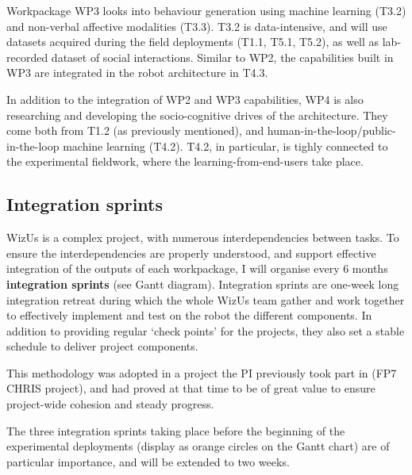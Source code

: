 \documentclass[11pt,a4paper]{report}
\newcommand{\project}{WizUs\xspace}
\begin{document}
Workpackage WP3 looks into behaviour generation using machine learning (T3.2)
and non-verbal affective modalities (T3.3). T3.2 is data-intensive, and will use
datasets acquired during the field deployments (T1.1, T5.1, T5.2), as well as
lab-recorded dataset of social interactions. Similar to WP2, the capabilities
built in WP3 are integrated in the robot architecture in T4.3.

In addition to the integration of WP2 and WP3 capabilities, WP4 is also
researching and developing the socio-cognitive drives of the architecture. They
come both from T1.2 (as previously mentioned), and
human-in-the-loop/public-in-the-loop machine learning (T4.2). T4.2, in
particular, is tighly connected to the experimental fieldwork, where the
learning-from-end-users take place.

\subsection{Integration sprints}

\project is a complex project, with numerous interdependencies between tasks.
To ensure the interdependencies are properly understood, and support effective
integration of the outputs of each workpackage, I will organise every 6 months
\textbf{integration sprints} (see Gantt diagram). Integration sprints are
one-week long integration retreat during which the whole \project team gather
and work together to effectively implement and test on the robot the different
components. In addition to providing regular `check points' for the projects,
they also set a stable schedule to deliver project components.

This methodology was adopted in a project the PI previously took part in (FP7
CHRIS project), and had proved at that time to be of great value to ensure
project-wide cohesion and steady progress.

The three integration sprints taking place before the beginning of the
experimental deployments (display as orange circles on the Gantt chart) are of
particular importance, and will be extended to two weeks.


\begin{figure}[!ht]
\resizebox{\linewidth}{!}{
    
}
\end{figure}
\end{document}
